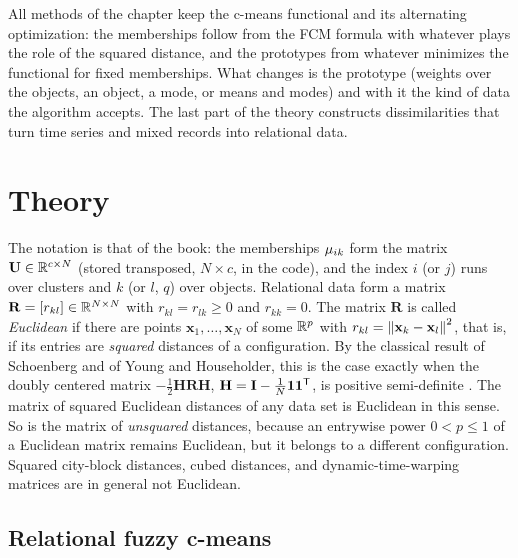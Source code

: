 All methods of the chapter keep the c-means functional and its alternating optimization: the memberships follow from the FCM formula with whatever plays the role of the squared distance, and the prototypes from whatever minimizes the functional for fixed memberships. What changes is the prototype (weights over the objects, an object, a mode, or means and modes) and with it the kind of data the algorithm accepts. The last part of the theory constructs dissimilarities that turn time series and mixed records into relational data.

\section{Theory}\label{sec:rel:theory}

The notation is that of the book: the memberships $\mu_{ik}$ form the matrix $\mathbf{U}\in\mathbb{R}^{c\times N}$ (stored transposed, $N\times c$, in the code), and the index $i$ (or $j$) runs over clusters and $k$ (or $l$, $q$) over objects. Relational data form a matrix $\mathbf{R}=[r_{kl}]\in\mathbb{R}^{N\times N}$ with $r_{kl}=r_{lk}\ge0$ and $r_{kk}=0$. The matrix $\mathbf{R}$ is called \emph{Euclidean} if there are points $\mathbf{x}_1,\dots,\mathbf{x}_N$ of some $\mathbb{R}^p$ with $r_{kl}=\left\lVert \mathbf{x}_k-\mathbf{x}_l \right\rVert^2$, that is, if its entries are \emph{squared} distances of a configuration. By the classical result of Schoenberg and of Young and Householder, this is the case exactly when the doubly centered matrix $-\tfrac12\mathbf{H}\mathbf{R}\mathbf{H}$, $\mathbf{H}=\mathbf{I}-\tfrac1N\mathbf{1}\mathbf{1}^{\mathsf{T}}$, is positive semi-definite \cite{gower:1986:euclidean}. The matrix of squared Euclidean distances of any data set is Euclidean in this sense. So is the matrix of \emph{unsquared} distances, because an entrywise power $0<p\le1$ of a Euclidean matrix remains Euclidean, but it belongs to a different configuration. Squared city-block distances, cubed distances, and dynamic-time-warping matrices are in general not Euclidean.

\subsection{Relational fuzzy c-means}\label{sec:rel:rfcm}

